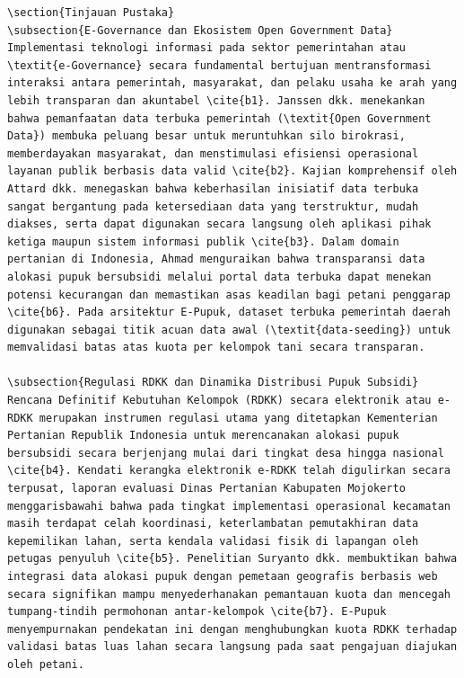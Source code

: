 \documentclass[conference]{IEEEtran}
\begin{document}
\begin{lstlisting}
\section{Tinjauan Pustaka}
\subsection{E-Governance dan Ekosistem Open Government Data}
Implementasi teknologi informasi pada sektor pemerintahan atau \textit{e-Governance} secara fundamental bertujuan mentransformasi interaksi antara pemerintah, masyarakat, dan pelaku usaha ke arah yang lebih transparan dan akuntabel \cite{b1}. Janssen dkk. menekankan bahwa pemanfaatan data terbuka pemerintah (\textit{Open Government Data}) membuka peluang besar untuk meruntuhkan silo birokrasi, memberdayakan masyarakat, dan menstimulasi efisiensi operasional layanan publik berbasis data valid \cite{b2}. Kajian komprehensif oleh Attard dkk. menegaskan bahwa keberhasilan inisiatif data terbuka sangat bergantung pada ketersediaan data yang terstruktur, mudah diakses, serta dapat digunakan secara langsung oleh aplikasi pihak ketiga maupun sistem informasi publik \cite{b3}. Dalam domain pertanian di Indonesia, Ahmad menguraikan bahwa transparansi data alokasi pupuk bersubsidi melalui portal data terbuka dapat menekan potensi kecurangan dan memastikan asas keadilan bagi petani penggarap \cite{b6}. Pada arsitektur E-Pupuk, dataset terbuka pemerintah daerah digunakan sebagai titik acuan data awal (\textit{data-seeding}) untuk memvalidasi batas atas kuota per kelompok tani secara transparan.

\subsection{Regulasi RDKK dan Dinamika Distribusi Pupuk Subsidi}
Rencana Definitif Kebutuhan Kelompok (RDKK) secara elektronik atau e-RDKK merupakan instrumen regulasi utama yang ditetapkan Kementerian Pertanian Republik Indonesia untuk merencanakan alokasi pupuk bersubsidi secara berjenjang mulai dari tingkat desa hingga nasional \cite{b4}. Kendati kerangka elektronik e-RDKK telah digulirkan secara terpusat, laporan evaluasi Dinas Pertanian Kabupaten Mojokerto menggarisbawahi bahwa pada tingkat implementasi operasional kecamatan masih terdapat celah koordinasi, keterlambatan pemutakhiran data kepemilikan lahan, serta kendala validasi fisik di lapangan oleh petugas penyuluh \cite{b5}. Penelitian Suryanto dkk. membuktikan bahwa integrasi data alokasi pupuk dengan pemetaan geografis berbasis web secara signifikan mampu menyederhanakan pemantauan kuota dan mencegah tumpang-tindih permohonan antar-kelompok \cite{b7}. E-Pupuk menyempurnakan pendekatan ini dengan menghubungkan kuota RDKK terhadap validasi batas luas lahan secara langsung pada saat pengajuan diajukan oleh petani.


\end{lstlisting}
\end{document}

